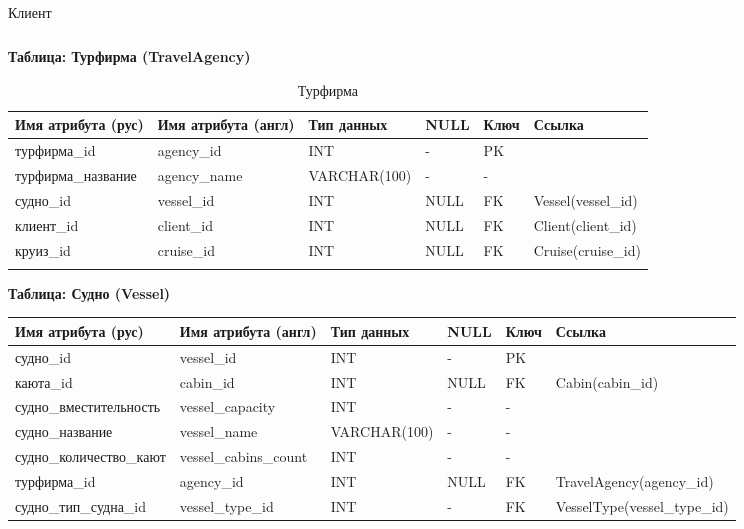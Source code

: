 \documentclass[11pt,a4paper,final]{article}
\begin{document}
\begin{landscape}
\begin{longtable}{|p{4.3cm}|p{4cm}|p{2.6cm}|p{1cm}|p{1cm}|p{2cm}|}
\caption{Клиент}
\end{longtable}

\newpage
    \ClearShipoutPicture %
    \thispagestyle{empty}
\textbf{Таблица: Турфирма (TravelAgency)}

\begin{longtable}{|p{4cm}|p{3cm}|p{2.6cm}|p{1cm}|p{1cm}|p{3cm}|}
\hline
Имя атрибута (рус) & Имя атрибута (англ) & Тип данных & NULL & Ключ & Ссылка \\ \hline
\endhead

турфирма\_id & agency\_id & INT & - & PK & \\ \hline
турфирма\_название & agency\_name & VARCHAR(100) & - & - & \\ \hline
судно\_id & vessel\_id & INT & NULL & FK & Vessel(vessel\_id) \\ \hline
клиент\_id & client\_id & INT & NULL & FK & Client(client\_id) \\ \hline
круиз\_id & cruise\_id & INT & NULL & FK & Cruise(cruise\_id) \\ \hline

\caption{Турфирма}
\end{longtable}

\textbf{Таблица: Судно (Vessel)}

\begin{longtable}{|p{4.2cm}|p{3.3cm}|p{2.6cm}|p{1cm}|p{1cm}|p{5cm}|}
\hline
Имя атрибута (рус) & Имя атрибута (англ) & Тип данных & NULL & Ключ & Ссылка \\ \hline
\endhead

судно\_id & vessel\_id & INT & - & PK & \\ \hline
каюта\_id & cabin\_id & INT & NULL & FK & Cabin(cabin\_id) \\ \hline
судно\_вместительность & vessel\_capacity & INT & - & - & \\ \hline
судно\_название & vessel\_name & VARCHAR(100) & - & - & \\ \hline
судно\_количество\_кают & vessel\_cabins\_count & INT & - & - & \\ \hline
турфирма\_id & agency\_id & INT & NULL & FK & TravelAgency(agency\_id) \\ \hline
судно\_тип\_судна\_id & vessel\_type\_id & INT & - & FK & VesselType(vessel\_type\_id) \\ \hline


\end{longtable}
\end{landscape}
\end{document}
